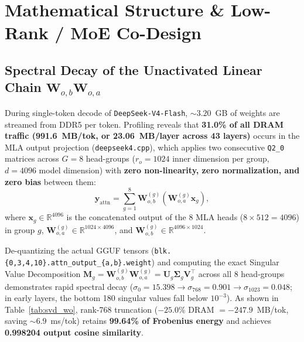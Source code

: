 \documentclass[10pt,twocolumn]{article}
\begin{document}
\section{Mathematical Structure \& Low-Rank / MoE Co-Design}
\label{sec:math}

\subsection{Spectral Decay of the Unactivated Linear Chain $\mathbf{W}_{o,b}\mathbf{W}_{o,a}$}
During single-token decode of \texttt{DeepSeek-V4-Flash}, $\sim 3.20$~GB of weights are streamed from DDR5 per token. Profiling reveals that \textbf{31.0\% of all DRAM traffic (991.6~MB/tok, or 23.06~MB/layer across 43 layers)} occurs in the MLA output projection (\texttt{deepseek4.cpp}), which applies two consecutive \texttt{Q2\_0} matrices across $G=8$ head-groups ($r_o = 1024$ inner dimension per group, $d = 4096$ model dimension) with \textbf{zero non-linearity, zero normalization, and zero bias} between them:
\begin{equation}
    \mathbf{y}_{\text{attn}} = \sum_{g=1}^{8} \mathbf{W}_{o,b}^{(g)} \!\left( \mathbf{W}_{o,a}^{(g)} \mathbf{x}_g \right),
\end{equation}
where $\mathbf{x}_g \in \mathbb{R}^{4096}$ is the concatenated output of the 8 MLA heads ($8 \times 512 = 4096$) in group $g$, $\mathbf{W}_{o,a}^{(g)} \in \mathbb{R}^{1024 \times 4096}$, and $\mathbf{W}_{o,b}^{(g)} \in \mathbb{R}^{4096 \times 1024}$.

De-quantizing the actual GGUF tensors (\texttt{blk.\{0,3,4,10\}.attn\_output\_\{a,b\}.weight}) and computing the exact Singular Value Decomposition $\mathbf{M}_g = \mathbf{W}_{o,b}^{(g)} \mathbf{W}_{o,a}^{(g)} = \mathbf{U}_g \boldsymbol{\Sigma}_g \mathbf{V}_g^\top$ across all 8 head-groups demonstrates rapid spectral decay ($\sigma_0 = 15.398 \to \sigma_{768} = 0.901 \to \sigma_{1023} = 0.048$; in early layers, the bottom 180 singular values fall below $10^{-3}$). As shown in Table~\ref{tab:svd_wo}, rank-768 truncation ($-25.0\%$ DRAM $= -247.9$~MB/tok, saving $\sim 6.9$~ms/tok) retains \textbf{99.64\% of Frobenius energy} and achieves \textbf{0.998204 output cosine similarity}.
\end{document}
